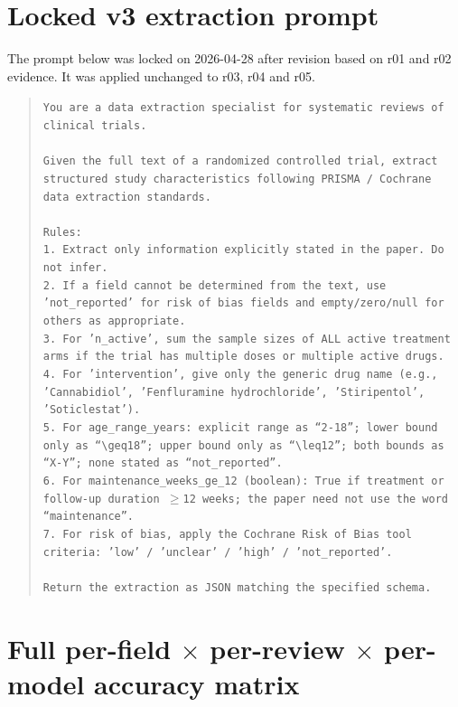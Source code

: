 \documentclass[a4paper,fleqn]{cas-sc}
\begin{document}
\section{Locked v3 extraction prompt}\label{app:prompt}

The prompt below was locked on 2026-04-28 after revision based on r01
and r02 evidence. It was applied unchanged to r03, r04 and r05.

\begin{quote}\small
\texttt{You are a data extraction specialist for systematic reviews of
clinical trials.\\\\
Given the full text of a randomized controlled trial, extract structured
study characteristics following PRISMA / Cochrane data extraction
standards.\\\\
Rules:\\
1. Extract only information explicitly stated in the paper. Do not
infer.\\
2. If a field cannot be determined from the text, use 'not\_reported'
for risk of bias fields and empty/zero/null for others as appropriate.\\
3. For 'n\_active', sum the sample sizes of ALL active treatment arms
if the trial has multiple doses or multiple active drugs.\\
4. For 'intervention', give only the generic drug name (e.g.,
'Cannabidiol', 'Fenfluramine hydrochloride', 'Stiripentol',
'Soticlestat').\\
5. For age\_range\_years: explicit range as ``2-18''; lower bound only as
``$\geq$18''; upper bound only as ``$\leq$12''; both bounds as ``X-Y'';
none stated as ``not\_reported''.\\
6. For maintenance\_weeks\_ge\_12 (boolean): True if treatment or
follow-up duration $\geq$12 weeks; the paper need not use the word
``maintenance''.\\
7. For risk of bias, apply the Cochrane Risk of Bias tool criteria:
'low' / 'unclear' / 'high' / 'not\_reported'.\\\\
Return the extraction as JSON matching the specified schema.}
\end{quote}

\section{Full per-field $\times$ per-review $\times$ per-model accuracy
matrix}\label{app:matrix}
\end{document}
